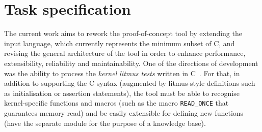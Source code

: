 


\section{Task specification}
\label{ch:intro:task}

The current work aims to rework the proof-of-concept tool \textit{\porthos{}} by extending the input language, which currently represents the minimum subset of C, and revising the general architecture of the tool in order to enhance performance, extensibility, reliability and maintainability.
One of the directions of development was the ability to process the \textit{kernel litmus tests} written in C~\cite{mckenney2017wg21}.
For that, in addition to supporting the C syntax (augmented by litmus-style definitions such as initialisation or assertion statements), the tool must be able to recognise kernel-specific functions and macros (such as the macro \texttt{READ\_ONCE} that guarantees memory read) and be easily extensible for defining new functions (have the separate module for the purpose of a knowledge base).

